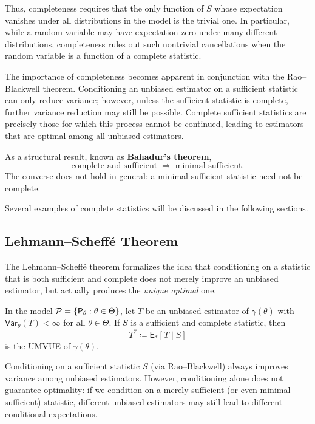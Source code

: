 \medskip

Thus, completeness requires that the only function of \(S\) whose expectation
vanishes under all distributions in the model is the trivial one.
In particular, while a random variable may have expectation zero under many
different distributions, completeness rules out such nontrivial cancellations
when the random variable is a function of a complete statistic.

The importance of completeness becomes apparent in conjunction with the
Rao--Blackwell theorem.
Conditioning an unbiased estimator on a sufficient statistic can only reduce
variance; however, unless the sufficient statistic is complete, further
variance reduction may still be possible.
Complete sufficient statistics are precisely those for which this process
cannot be continued, leading to estimators that are optimal among all unbiased
estimators.

\medskip

As a structural result, known as \textbf{Bahadur's theorem},
\[
    \text{complete and sufficient}
    \;\Longrightarrow\;
    \text{minimal sufficient}.
\]
The converse does not hold in general: a minimal sufficient statistic need not
be complete.

\medskip

Several examples of complete statistics will be discussed in the following
sections.

\subsection{Lehmann--Scheff\'e Theorem}%
\label{sub:ls}

The Lehmann--Scheff\'e theorem formalizes the idea that conditioning on a statistic that is both sufficient and complete does not merely improve an unbiased estimator, but actually produces the \emph{unique optimal} one.

\begin{theo}
\label{theo:ls}
In the model \(\mathcal{P}=\{\mathsf{P}_{\theta} : \theta\in \Theta\}\), let \(T\) be an unbiased estimator of \(\gamma(\theta)\) with \(\mathsf{Var}_{\theta}(T)<\infty\) for all \(\theta\in\Theta\).  
If \(S\) is a sufficient and complete statistic, then
\[
T^{*} \coloneqq \mathsf{E}_{*}[T \mid S]
\]
is the UMVUE of \(\gamma(\theta)\).
\end{theo}

Conditioning on a sufficient statistic \(S\) (via Rao--Blackwell) always improves variance among unbiased estimators.  
However, conditioning alone does not guarantee optimality: if we condition on a merely sufficient (or even minimal sufficient) statistic, different unbiased estimators may still lead to different conditional expectations.

